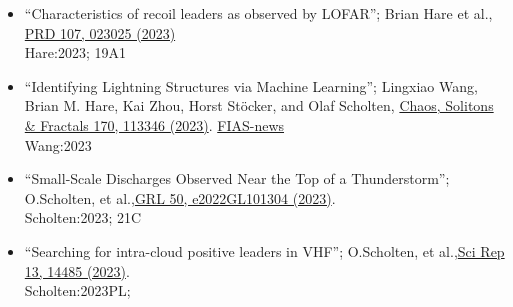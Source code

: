 \documentclass[fleqn,11pt]{article}
\begin{document}
\begin{itemize}
\begin{itemize}
\item ``Characteristics of recoil leaders as observed by LOFAR''; Brian Hare et al.,
    \href{https://doi.org/10.1103/PhysRevD.107.023025}{PRD 107, 023025 (2023)}
    \\Hare:2023; 19A1

\item ``Identifying Lightning Structures via Machine Learning'';
   Lingxiao Wang, Brian M. Hare, Kai Zhou, Horst St\"{o}cker, and Olaf Scholten,
   \href{https://doi.org/10.1016/j.chaos.2023.113346}{Chaos, Solitons \& Fractals 170, 113346 (2023)}.
   \href{https://fias.news/en/news-publicity/algorithms-illuminate-lightning-structures/?bid=3}{FIAS-news}
   \\Wang:2023

\item ``Small-Scale Discharges Observed Near the Top of a Thunderstorm''; O.Scholten, et al.,\href{http://doi.org/10.1029/2022GL101304}{GRL 50, e2022GL101304 (2023)}.
    \\Scholten:2023; 21C

\item ``Searching for intra-cloud positive leaders in VHF''; O.Scholten, et al.,\href{https://doi.org/10.1038/s41598-023-41218-x}{Sci Rep 13, 14485 (2023)}.
    \\Scholten:2023PL; 

\end{itemize}
\end{itemize}
\end{document}
